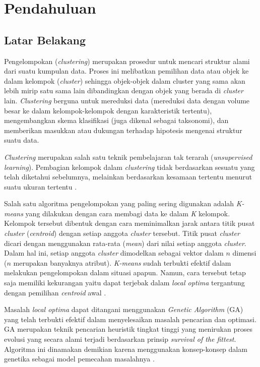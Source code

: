 \chapter{Pendahuluan}
\label{chap:intro}
   
\section{Latar Belakang}
\label{sec:label}

Pengelompokan (\textit{clustering}) merupakan prosedur untuk mencari struktur alami dari suatu kumpulan data. Proses ini melibatkan pemilihan data atau objek ke dalam kelompok (\textit{cluster}) sehingga objek-objek dalam cluster yang sama akan lebih mirip satu sama lain dibandingkan dengan objek yang berada di \textit{cluster} lain. \textit{Clustering} berguna untuk mereduksi data (mereduksi data dengan volume besar ke dalam kelompok-kelompok dengan karakteristik tertentu), mengembangkan skema klasifikasi (juga dikenal sebagai taksonomi), dan memberikan masukkan atau dukungan terhadap hipotesis mengenai struktur suatu data.

\textit{Clustering} merupakan salah satu teknik pembelajaran tak terarah (\textit{unsupervised learning}). Pembagian kelompok dalam \textit{clustering} tidak berdasarkan sesuatu yang telah diketahui sebelumnya, melainkan berdasarkan kesamaan tertentu menurut suatu ukuran tertentu \cite{raposo2014automatic}.

Salah satu algoritma pengelompokan yang paling sering digunakan adalah \textit{K-means} yang dilakukan dengan cara membagi data ke dalam \textit{K} kelompok. Kelompok tersebut dibentuk dengan cara meminimalkan jarak antara titik pusat \textit{cluster} (\textit{centroid}) dengan setiap anggota \textit{cluster} tersebut. Titik pusat \textit{cluster} dicari dengan menggunakan rata-rata (\textit{mean}) dari nilai setiap anggota \textit{cluster}. Dalam hal ini, setiap anggota \textit{cluster} dimodelkan sebagai vektor dalam $n$ dimensi ($n$ merupakan banyaknya atribut). \textit{K-means} sudah terbukti efektif dalam melakukan pengelompokan  dalam situasi apapun. Namun, cara tersebut tetap saja memiliki kekurangan yaitu dapat terjebak dalam \textit{local optima} tergantung dengan pemilihan \textit{centroid} awal \cite{maulik2000genetic}.

Masalah \textit{local optima} dapat ditangani menggunakan \textit{Genetic Algorithm} (GA) yang telah terbukti efektif dalam menyelesaikan masalah pencarian dan optimasi. GA merupakan teknik pencarian heuristik tingkat tinggi yang menirukan proses evolusi yang secara alami terjadi \cite{holland1992genetic} berdasarkan prinsip \textit{survival of the fittest}. Algoritma ini dinamakan demikian karena menggunakan konsep-konsep dalam genetika sebagai model pemecahan masalahnya \cite{sivanandam2007introduction}.

